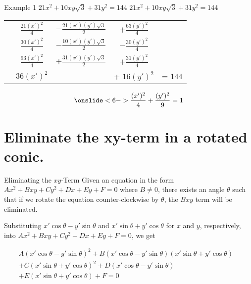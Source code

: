 \documentclass[t,usenames,dvipsnames]{beamer}
\begin{document}
\begin{frame}{Example 1 \quad $21x^2 + 10xy\sqrt{3} + 31y^2 = 144$}
$21x^2 + 10xy\sqrt{3} + 31y^2 = 144$    \newline\\
\setlength{\extrarowheight}{6pt}
\begin{tabular}{ccccc}
    \onslide<2->{& $\frac{21(x')^2}{4}$ &  $- \frac{21(x')(y')\sqrt{3}}{2}$ & $+ \frac{63(y')^2}{4}$ &  }\\[12pt]
    \onslide<3->{& $\frac{30(x')^2}{4}$ &  $- \frac{10(x')(y')\sqrt{3}}{2}$ & $-\frac{30(y')^2}{4}$ & }\\[12pt]
    \onslide<4->{+& $\frac{93(x')^2}{4}$ & $+ \frac{31(x')(y')\sqrt{3}}{2}$ & $ + \frac{31(y')^2}{4}$ \\[12pt]    \hline}
    \onslide<5->{& $36(x')^2$ & & + $16(y')^2$ & = 144 }\\
\end{tabular}
\[  \onslide<6->{\frac{(x')^2}{4} + \frac{(y')^2}{9} = 1}
\]
\end{frame}

\section{Eliminate the xy-term in a rotated conic.}

\begin{frame}{Eliminating the $xy$-Term}
Given an equation in the form $Ax^2 + Bxy + Cy^2 + Dx + Ey + F = 0$ where $B \neq 0$, there exists an angle $\theta$ such that if we rotate the equation counter-clockwise by $\theta$, the $Bxy$ term will be eliminated.  \newline\\   \pause

Substituting $x'\cos \theta - y'\sin \theta$ and $x'\sin\theta + y'\cos\theta$ for $x$ and $y$, respectively, into $Ax^2 + Bxy + Cy^2 + Dx + Ey + F = 0$, we get \pause

\begin{equation*}
\begin{split}
A(x'\cos\theta - y'\sin\theta)^2 + B(x'\cos\theta-y'\sin\theta)(x'\sin\theta + y'\cos\theta)   &\\ + C(x'\sin\theta + y'\cos\theta)^2 + D(x'\cos\theta - y'\sin\theta)  &\\  + E(x'\sin\theta + y'\cos\theta) + F = 0
\end{split}
\end{equation*}
\end{frame}
\end{document}
